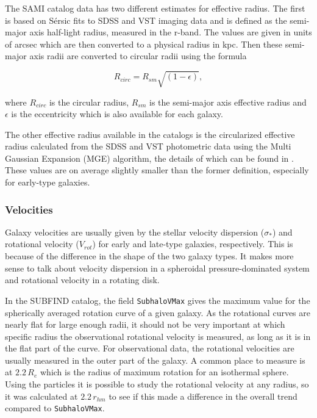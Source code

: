 The SAMI catalog data has two different estimates for effective radius. The first is based on Sérsic fits to SDSS and VST imaging data and is defined as the semi-major axis half-light radius, measured in the r-band. The values are given in units of arcsec which are then converted to a physical radius in kpc. Then these semi-major axis radii are converted to circular radii using the formula

\begin{equation}
   R_{circ} = R_{sm}\sqrt{(1-\epsilon)},
\end{equation}

where $R_{circ}$ is the circular radius, $R_{sm}$ is the semi-major axis effective radius and $\epsilon$ is the eccentricity which is also available for each galaxy.

The other effective radius available in the catalogs is the circularized effective radius calculated from the SDSS and VST photometric data using the Multi Gaussian Expansion (MGE) algorithm, the details of which can be found in \textcite{Scott2021}. These values are on average slightly smaller than the former definition, especially for early-type galaxies.

\subsubsection{Velocities}

Galaxy velocities are usually given by the stellar velocity dispersion ($\sigma_*$) and rotational velocity ($V_{rot}$) for early and late-type galaxies, respectively. This is because of the difference in the shape of the two galaxy types. It makes more sense to talk about velocity dispersion in a spheroidal pressure-dominated system and rotational velocity in a rotating disk.

In the SUBFIND catalog, the field \texttt{SubhaloVMax} gives the maximum value for the spherically averaged rotation curve of a given galaxy. As the rotational curves are nearly flat for large enough radii, it should not be very important at which specific radius the observational rotational velocity is measured, as long as it is in the flat part of the curve. For observational data, the rotational velocities are usually measured in the outer part of the galaxy. A common place to measure is at $2.2\, R_e$ which is the radius of maximum rotation for an isothermal sphere. Using the particles it is possible to study the rotational velocity at any radius, so it was calculated at $2.2\, r_{hm}$ to see if this made a difference in the overall trend compared to \texttt{SubhaloVMax}. 

